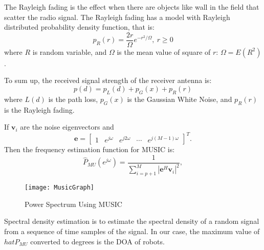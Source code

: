 The Rayleigh fading is the effect when there are objects like wall in the field that scatter the radio signal. The Rayleigh fading has a model with Rayleigh distributed probability density function, that is:
\begin{equation}
p_{R}(r)={\frac {2r}{\Omega }}e^{-r^{2}/\Omega },\ r\geq {}0
\end{equation}
where $R$ is random variable, and $\Omega$ is the mean value of square of $r$: $\Omega = E(R^{2})$.
\vspace{1cm}

To sum up, the received signal strength of the receiver antenna is:
\begin{equation}
p(d)=p_{L}(d)+p_{G}(x)+p_{R}(r)
\end{equation}
where $L(d)$ is the path loss, $p_{G}(x)$ is the Gaussian White Noise, and $p_{R}(r)$ is the Rayleigh fading.
\vspace{1cm}



If $\mathbf{v}_i$ are the noise eigenvectors and
\begin{equation}
\mathbf{e} = \begin{bmatrix}1 & e^{j \omega} & e^{j 2 \omega} & \cdots & e^{j (M-1) \omega}\end{bmatrix}^T.
\end{equation}
Then the frequency estimation function for MUSIC is:
\begin{equation}
\hat P_{MU}(e^{j \omega}) = \frac{1}{\sum_{i=p+1}^{M} |\mathbf{e}^{H} \mathbf{v}_i|^2},
\end{equation}
\begin{figure}[ht]
	\centering
	\texttt{[image: MusicGraph]}
	\caption{Power Spectrum Using MUSIC}
	\end{figure}
Spectral density estimation is to estimate the spectral density of a random signal from a sequence of time samples of the signal. In our case, the maximum value of $hat P_{MU}$ converted to degrees is the DOA of robots.
